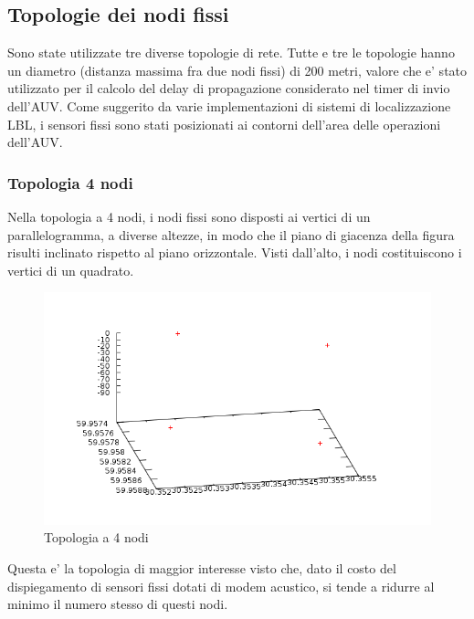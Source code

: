 \documentclass[Lau,binding=0.6cm]{sapthesis}
\begin{document}
\subsection{Topologie dei nodi fissi}
Sono state utilizzate tre diverse topologie di rete. Tutte e tre le topologie hanno un diametro (distanza massima fra due nodi fissi) di 200 metri, valore che e' stato utilizzato per il calcolo del delay di propagazione considerato nel timer di invio dell'AUV. Come suggerito da varie implementazioni di sistemi di localizzazione LBL, i sensori fissi sono stati posizionati ai contorni dell'area delle operazioni dell'AUV. \newline
\subsubsection{Topologia 4 nodi}
Nella topologia a 4 nodi, i nodi fissi sono disposti ai vertici di un parallelogramma, a diverse altezze, in modo che il piano di giacenza della figura risulti inclinato rispetto al piano orizzontale. Visti dall'alto, i nodi costituiscono i vertici di un quadrato.
\begin{figure}[H]
    \centering
    \includegraphics[width=\linewidth]{squaretopology.png}
    \caption{Topologia a 4 nodi}
    \label{fig:my_label}
\end{figure}
Questa e' la topologia di maggior interesse visto che, dato il costo del dispiegamento di sensori fissi dotati di modem acustico, si tende a ridurre al minimo il numero stesso di questi nodi.
\end{document}

